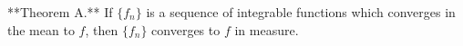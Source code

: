 **Theorem A.** If $\{f_n\}$ is a sequence of integrable functions which converges in the mean to $f$, then $\{f_n\}$ converges to $f$ in measure.
